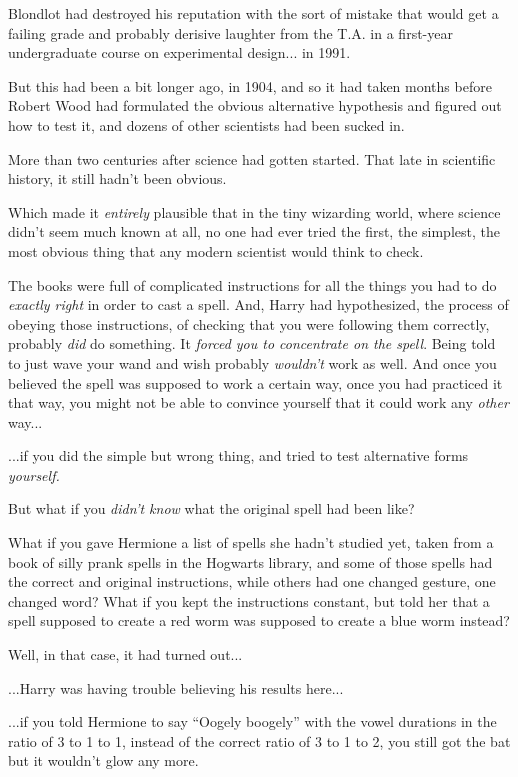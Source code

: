 Blondlot had destroyed his reputation with the sort of mistake that
would get a failing grade and probably derisive laughter from the T.A.
in a first-year undergraduate course on experimental design... in
1991.

But this had been a bit longer ago, in 1904, and so it had taken months
before Robert Wood had formulated the obvious alternative hypothesis and
figured out how to test it, and dozens of other scientists had been
sucked in.

More than two centuries after science had gotten started. That late in
scientific history, it still hadn't been obvious.

Which made it \emph{entirely} plausible that in the tiny wizarding
world, where science didn't seem much known at all, no one had ever
tried the first, the simplest, the most obvious thing that any modern
scientist would think to check.

The books were full of complicated instructions for all the things you
had to do \emph{exactly right} in order to cast a spell. And, Harry had
hypothesized, the process of obeying those instructions, of checking
that you were following them correctly, probably \emph{did} do
something. It \emph{forced you to concentrate on the spell}. Being told
to just wave your wand and wish probably \emph{wouldn't} work as well.
And once you believed the spell was supposed to work a certain way, once
you had practiced it that way, you might not be able to convince
yourself that it could work any \emph{other} way...

...if you did the simple but wrong thing, and tried to test
alternative forms \emph{yourself.}

But what if you \emph{didn't know} what the original spell had been
like?

What if you gave Hermione a list of spells she hadn't studied yet, taken
from a book of silly prank spells in the Hogwarts library, and some of
those spells had the correct and original instructions, while others had
one changed gesture, one changed word? What if you kept the instructions
constant, but told her that a spell supposed to create a red worm was
supposed to create a blue worm instead?

Well, in that case, it had turned out...

...Harry was having trouble believing his results here...

...if you told Hermione to say ``Oogely boogely'' with the vowel
durations in the ratio of 3 to 1 to 1, instead of the correct ratio of 3
to 1 to 2, you still got the bat but it wouldn't glow any more.

